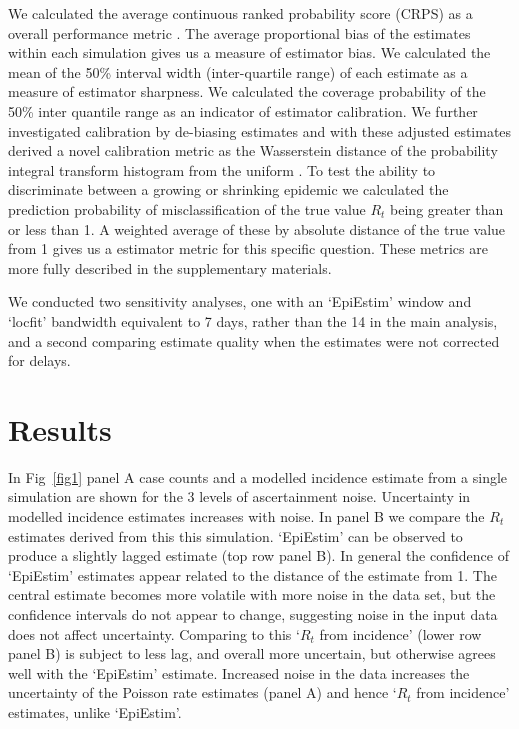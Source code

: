 \documentclass[10pt,letterpaper]{article}
\begin{document}
We calculated the average continuous ranked probability score (CRPS) as a overall performance metric \cite{anderson1996,bosse2024,bosse2023,brocker2008,gneiting2007}. The average proportional bias of the estimates within each simulation gives us a measure of estimator bias. We calculated the mean of the 50\% interval width (inter-quartile range) of each estimate as a measure of estimator sharpness. We calculated the coverage probability of the 50\% inter quantile range as an indicator of estimator calibration. We further investigated calibration by de-biasing estimates and with these adjusted estimates derived a novel calibration metric as the Wasserstein distance \cite{panaretos2019} of the probability integral transform histogram from the uniform \cite{david1948,hamill2001,wilks2019,brockwell2007}. To test the ability to discriminate between a growing or shrinking epidemic we calculated the prediction probability of misclassification of the true value $R_t$ being greater than or less than 1. A weighted average of these by absolute distance of the true value from 1 gives us a estimator metric for this specific question. These metrics are more fully described in the supplementary materials.

We conducted two sensitivity analyses, one with an `EpiEstim' window and `locfit' bandwidth equivalent to 7 days, rather than the 14 in the main analysis, and a second comparing estimate quality when the estimates were not corrected for delays.

\section*{Results}

In Fig~\ref{fig1} panel A case counts and a modelled incidence estimate from a single simulation are shown for the 3 levels of ascertainment noise. Uncertainty in modelled incidence estimates increases with noise. In panel B we compare the $R_t$ estimates derived from this this simulation. `EpiEstim' can be observed to produce a slightly lagged estimate (top row panel B). In general the confidence of `EpiEstim' estimates appear related to the distance of the estimate from 1. The central estimate becomes more volatile with more noise in the data set, but the confidence intervals do not appear to change, suggesting noise in the input data does not affect uncertainty. Comparing to this `$R_t$ from incidence' (lower row panel B) is subject to less lag, and overall more uncertain, but otherwise agrees well with the `EpiEstim' estimate. Increased noise in the data increases the uncertainty of the Poisson rate estimates (panel A) and hence `$R_t$ from incidence' estimates, unlike `EpiEstim'.
\end{document}
